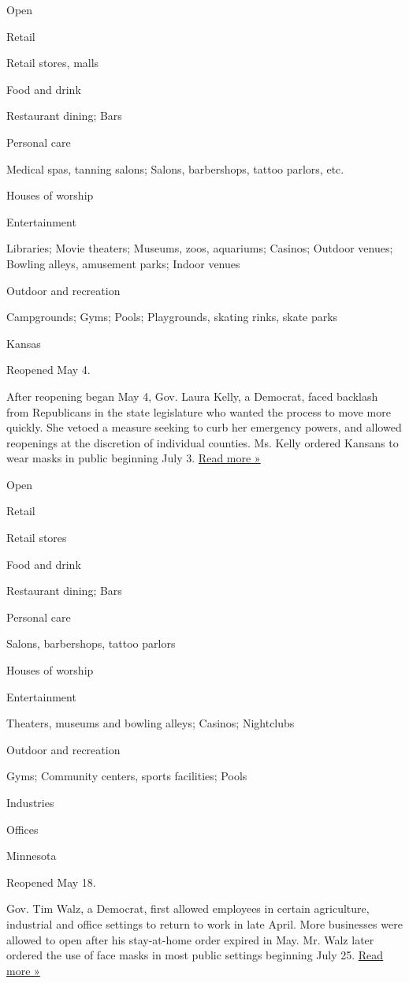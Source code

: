 Open

Retail

Retail stores, malls

Food and drink

Restaurant dining; Bars

Personal care

Medical spas, tanning salons; Salons, barbershops, tattoo parlors, etc.

Houses of worship

Entertainment

Libraries; Movie theaters; Museums, zoos, aquariums; Casinos; Outdoor
venues; Bowling alleys, amusement parks; Indoor venues

Outdoor and recreation

Campgrounds; Gyms; Pools; Playgrounds, skating rinks, skate parks

Kansas

Reopened May 4.

After reopening began May 4, Gov. Laura Kelly, a Democrat, faced
backlash from Republicans in the state legislature who wanted the
process to move more quickly. She vetoed a measure seeking to curb her
emergency powers, and allowed reopenings at the discretion of individual
counties. Ms. Kelly ordered Kansans to wear masks in public beginning
July 3.
\href{https://www.kansas.com/news/politics-government/article244554662.html}{Read
more »}

Open

Retail

Retail stores

Food and drink

Restaurant dining; Bars

Personal care

Salons, barbershops, tattoo parlors

Houses of worship

Entertainment

Theaters, museums and bowling alleys; Casinos; Nightclubs

Outdoor and recreation

Gyms; Community centers, sports facilities; Pools

Industries

Offices

Minnesota

Reopened May 18.

Gov. Tim Walz, a Democrat, first allowed employees in certain
agriculture, industrial and office settings to return to work in late
April. More businesses were allowed to open after his stay-at-home order
expired in May. Mr. Walz later ordered the use of face masks in most
public settings beginning July 25.
\href{https://www.startribune.com/walz-mandates-masks-indoors-across-state/571861471/}{Read
more »}

